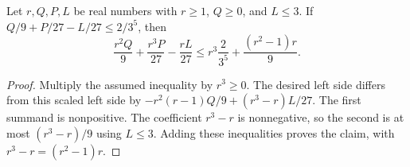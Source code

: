 \begin{lemma}
Let $r,Q,P,L$ be real numbers with $r\ge1$, $Q\ge0$, and $L\le3$.
If $Q/9+P/27-L/27\le2/3^5$, then
\[
\frac{r^2Q}{9}+\frac{r^3P}{27}-\frac{rL}{27}
\le r^3\frac{2}{3^5}+\frac{(r^2-1)r}{9}.
\]
\end{lemma}
\begin{proof}
Multiply the assumed inequality by $r^3\ge0$. The desired left side
differs from this scaled left side by
$-r^2(r-1)Q/9+(r^3-r)L/27$.
The first summand is nonpositive. The coefficient $r^3-r$ is
nonnegative, so the second is at most $(r^3-r)/9$ using $L\le3$.
Adding these inequalities proves the claim, with
$r^3-r=(r^2-1)r$.
\end{proof}
